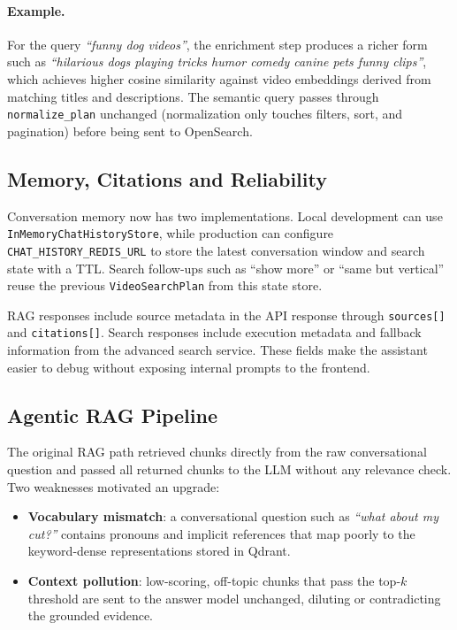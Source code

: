 \paragraph{Example.}
For the query \emph{``funny dog videos''}, the enrichment step produces a richer form such as
\emph{``hilarious dogs playing tricks humor comedy canine pets funny clips''}, which achieves
higher cosine similarity against video embeddings derived from matching titles and descriptions.
The semantic query passes through \texttt{normalize\_plan} unchanged (normalization only touches
filters, sort, and pagination) before being sent to OpenSearch.

\subsection{Memory, Citations and Reliability}

Conversation memory now has two implementations. Local development can use
\texttt{InMemoryChatHistoryStore}, while production can configure \texttt{CHAT\_HISTORY\_REDIS\_URL}
to store the latest conversation window and search state with a TTL. Search follow-ups such as
``show more'' or ``same but vertical'' reuse the previous \texttt{VideoSearchPlan} from this
state store.

RAG responses include source metadata in the API response through \texttt{sources[]} and
\texttt{citations[]}. Search responses include execution metadata and fallback information from
the advanced search service. These fields make the assistant easier to debug without exposing
internal prompts to the frontend.

\subsection{Agentic RAG Pipeline}

The original RAG path retrieved chunks directly from the raw conversational question and passed
all returned chunks to the LLM without any relevance check. Two weaknesses motivated an upgrade:

\begin{itemize}
  \item \textbf{Vocabulary mismatch}: a conversational question such as \emph{``what about my
    cut?''} contains pronouns and implicit references that map poorly to the keyword-dense
    representations stored in Qdrant.
  \item \textbf{Context pollution}: low-scoring, off-topic chunks that pass the top-$k$
    threshold are sent to the answer model unchanged, diluting or contradicting the grounded
    evidence.
\end{itemize}


